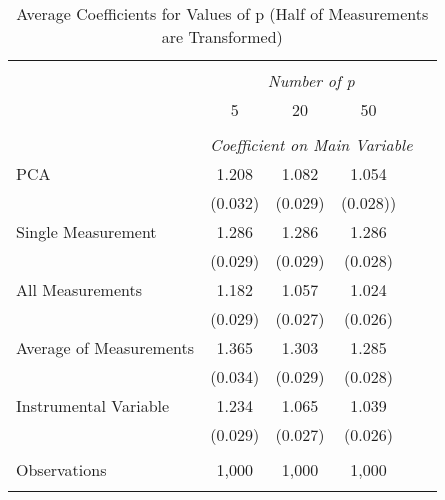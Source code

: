 \begin{table}[!htbp] \centering
  \caption{Average Coefficients for Values of p (Half of Measurements are Transformed) \label{sim_p_5_exp}}
\begin{tabular}{@{\extracolsep{5pt}}lccccc}
\\[-1.8ex]\hline
\hline \\[-1.8ex]
& \multicolumn{4}{c}{\textit{Number of p}} \
\cr \
\\[-1.8ex] & 5 & 20 & 50 \\
\hline \\[-1.8ex]
& \multicolumn{4}{c}{\textit{Coefficient on Main Variable}} \\
PCA & 1.208 & 1.082 & 1.054\\
& (0.032) & (0.029) & (0.028))\\
Single Measurement & 1.286 & 1.286 & 1.286 &  \\
& (0.029) & (0.029) & (0.028) &\\
All Measurements & 1.182 & 1.057 & 1.024  \\
  & (0.029) & (0.027) & (0.026)\\
 Average of Measurements & 1.365 & 1.303 & 1.285  \\
  & (0.034) & (0.029) & (0.028)\\
  Instrumental Variable & 1.234 & 1.065 & 1.039 \\
  & (0.029) & (0.027) & (0.026) \\
  
\hline \\[-1.8ex]
 Observations & 1,000 & 1,000 & 1,000  \\
\hline
\hline \\[-1.8ex]
\end{tabular}
\end{table}